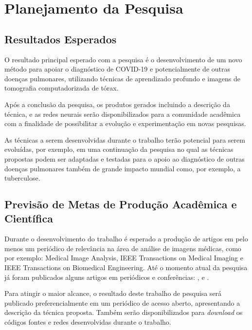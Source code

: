 \chapter{Planejamento da Pesquisa} \label{cap:cap_planejamento}


\section{Resultados Esperados}\label{sec:cap_planejamento_resultados}

O resultado principal esperado com a pesquisa é o desenvolvimento de um novo método para apoiar o diagnóstico de COVID-19 e potencialmente de outras doenças pulmonares, utilizando técnicas de aprendizado profundo e imagens de tomografia computadorizada de tórax. 

Após a conclusão da pesquisa, os produtos gerados incluindo a descrição da técnica, e as redes neurais serão disponibilizados para a comunidade acadêmica com a finalidade de possibilitar a evolução e experimentação em novas pesquisas.

As técnicas a serem desenvolvidas durante o trabalho terão potencial para serem evoluídas, por exemplo, em uma continuação da pesquisa no qual as técnicas propostas podem ser adaptadas e testadas para o apoio ao diagnóstico de outras doenças pulmonares também de grande impacto mundial como, por exemplo, a tuberculose. 

\section{Previsão de Metas de Produção Acadêmica e Científica }\label{sec:cap_planejamento_metas}

Durante o desenvolvimento do trabalho é esperado a produção de artigos em pelo menos um periódico de relevância na área de análise de imagens médicas, como por exemplo: Medical Image Analysis, IEEE Transactions on Medical Imaging e IEEE Transactions on Biomedical Engineering. Até o momento atual da pesquisa já foram publicados alguns artigos em periódicos e conferências: \cite{Lacerda2020AGrowing}, \cite{lacerda2021hyperparameter} e \cite{barros2021pulmonary}.

Para atingir o maior alcance, o resultado deste trabalho de pesquisa será publicado preferencialmente em um periódico de acesso aberto, apresentando a descrição da técnica proposta. Também serão disponibilizados para \textit{download} os códigos fontes e redes desenvolvidas durante o trabalho.

